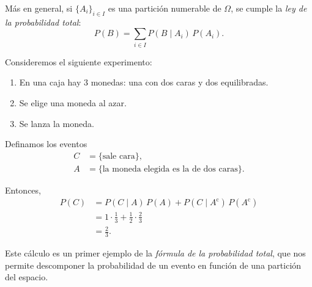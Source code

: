 Más en general, si $\{A_i\}_{i \in I}$ es una partición numerable de $\Omega$, se cumple la \textit{ley de la probabilidad total}:
\begin{equation*}
    P(B) = \sum_{i \in I} P(B \mid A_i)\,P(A_i).
\end{equation*}

\begin{example}
    Consideremos el siguiente experimento:
    \begin{centeredvarwidth}
        \begin{enumerate}
            \item En una caja hay $3$ monedas: una con dos caras y dos equilibradas.
            \item Se elige una moneda al azar.
            \item Se lanza la moneda.
        \end{enumerate}
    \end{centeredvarwidth}

    Definamos los eventos
    \begin{align*}
        C &= \{\text{sale cara}\}, \\
        A &= \{\text{la moneda elegida es la de dos caras}\}.
    \end{align*}

    Entonces,
    \begin{align*}
        P(C) &= P(C \mid A)\,P(A) + P(C \mid A^{\mathrm{c}})\,P(A^{\mathrm{c}}) \\
             &= 1 \cdot \frac{1}{3} + \frac{1}{2} \cdot \frac{2}{3} \\
             &= \frac{2}{3}.
    \end{align*}
\end{example}

Este cálculo es un primer ejemplo de la \textit{fórmula de la probabilidad total}, que nos permite descomponer la probabilidad de un evento en función de una partición del espacio.

